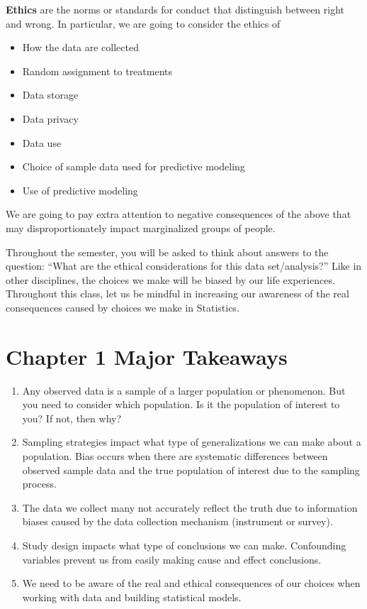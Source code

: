 \documentclass[
]{book}
\providecommand{\tightlist}{%
  \setlength{\itemsep}{0pt}\setlength{\parskip}{0pt}}
\begin{document}
\textbf{Ethics} are the norms or standards for conduct that distinguish between right and wrong. In particular, we are going to consider the ethics of

\begin{itemize}
\tightlist
\item
  How the data are collected
\item
  Random assignment to treatments
\item
  Data storage
\item
  Data privacy
\item
  Data use
\item
  Choice of sample data used for predictive modeling
\item
  Use of predictive modeling
\end{itemize}

We are going to pay extra attention to negative consequences of the above that may disproportionately impact marginalized groups of people.

Throughout the semester, you will be asked to think about answers to the question: ``What are the ethical considerations for this data set/analysis?'' Like in other disciplines, the choices we make will be biased by our life experiences. Throughout this class, let us be mindful in increasing our awareness of the real consequences caused by choices we make in Statistics.

\section{Chapter 1 Major Takeaways}\label{chapter-1-major-takeaways}

\begin{enumerate}
\def\labelenumi{\arabic{enumi}.}
\item
  Any observed data is a sample of a larger population or phenomenon. But you need to consider which population. Is it the population of interest to you? If not, then why?
\item
  Sampling strategies impact what type of generalizations we can make about a population. Bias occurs when there are systematic differences between observed sample data and the true population of interest due to the sampling process.
\item
  The data we collect many not accurately reflect the truth due to information biases caused by the data collection mechanism (instrument or survey).
\item
  Study design impacts what type of conclusions we can make. Confounding variables prevent us from easily making cause and effect conclusions.
\item
  We need to be aware of the real and ethical consequences of our choices when working with data and building statistical models.
\end{enumerate}
\end{document}
